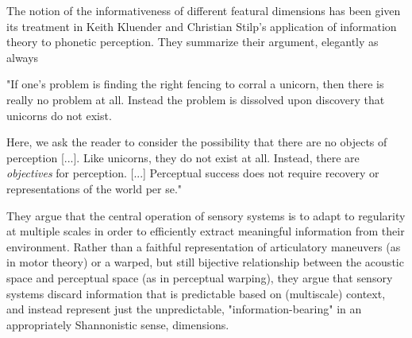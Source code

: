 

The notion of the informativeness of different featural dimensions has been given its  treatment in Keith Kluender and Christian Stilp's application of information theory to phonetic perception\citep{kluenderLongstandingProblemsSpeech2019a,kluenderPerceptionVowelSounds2013,stilpEfficientCodingStatistically2012,stilpRapidEfficientCoding2010}. They summarize their argument, elegantly as always

\begin{leftbar}
"If one's problem is finding the right fencing to corral a unicorn, then there is really no problem at all. Instead the problem is dissolved upon discovery that unicorns do not exist.

Here, we ask the reader to consider the possibility that there are no objects of perception [...]. Like unicorns, they do not exist at all. Instead, there are \textit{objectives} for perception. [...] Perceptual success does not require recovery or representations of the world per se." \citep{kluenderLongstandingProblemsSpeech2019a}
\end{leftbar}

They argue that the central operation of sensory systems is to adapt to regularity at multiple scales in order to efficiently extract meaningful information from their environment. Rather than a faithful representation of articulatory maneuvers (as in motor theory) or a warped, but still bijective relationship between the acoustic space and perceptual space (as in perceptual warping), they argue that sensory systems discard information that is predictable based on (multiscale) context, and instead represent just the unpredictable, "information-bearing" in an appropriately Shannonistic sense, dimensions. 

